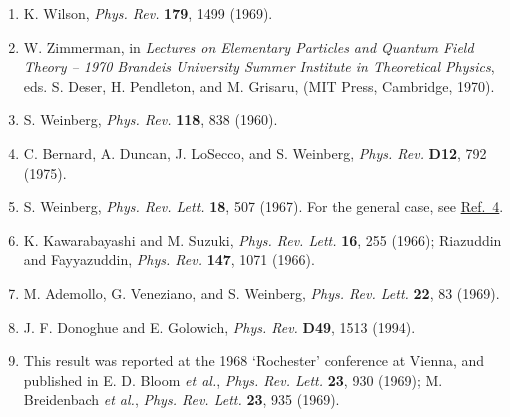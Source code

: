 


\begin{enumerate}
\item {}\label{ch20-ref-1}
K. Wilson, \emph{Phys. Rev.} \textbf{179}, 1499 (1969).

\item {}\label{ch20-ref-2}
W. Zimmerman, in \emph{Lectures on Elementary Particles and Quantum Field Theory -- 1970 Brandeis University Summer Institute in Theoretical Physics}, eds. S. Deser, H. Pendleton, and M. Grisaru, (MIT Press, Cambridge, 1970).

\item {}\label{ch20-ref-3}
S. Weinberg, \emph{Phys. Rev.} \textbf{118}, 838 (1960).

\item {}\label{ch20-ref-4}
C. Bernard, A. Duncan, J. LoSecco, and S. Weinberg, \emph{Phys. Rev.} \textbf{D12}, 792 (1975).

\item {}\label{ch20-ref-5}
S. Weinberg, \emph{Phys. Rev. Lett.} \textbf{18}, 507 (1967). For the general case, see \hyperref[ch20-ref-4]{Ref.~4}.

\item {}\label{ch20-ref-6}
K. Kawarabayashi and M. Suzuki, \emph{Phys. Rev. Lett.} \textbf{16}, 255 (1966); Riazuddin and Fayyazuddin, \emph{Phys. Rev.} \textbf{147}, 1071 (1966).

\item {}\label{ch20-ref-7}
M. Ademollo, G. Veneziano, and S. Weinberg, \emph{Phys. Rev. Lett.} \textbf{22}, 83 (1969).

\item {}\label{ch20-ref-8}
J. F. Donoghue and E. Golowich, \emph{Phys. Rev.} \textbf{D49}, 1513 (1994).

\item {}\label{ch20-ref-9}
This result was reported at the 1968 `Rochester' conference at Vienna, and published in E. D. Bloom \emph{et al.}, \emph{Phys. Rev. Lett.} \textbf{23}, 930 (1969); M. Breidenbach \emph{et al.}, \emph{Phys. Rev. Lett.} \textbf{23}, 935 (1969).


\end{enumerate}
